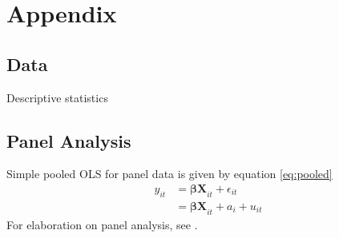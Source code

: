 \section{Appendix}
\label{s:appendix}

\subsection{Data}
\label{s:data}
\begin{table}
  \centering
  \caption{Descriptive statistics}
  \label{t:descriptive}
  
\end{table}

\subsection{Panel Analysis}
\label{s:appendix_panel}
Simple pooled OLS for panel data is given by equation \eqref{eq:pooled} \citep{wooldridge2019introductory}
\begin{align}\label{eq:pooled}
    y_{it}
    &= \bm{\beta X}_{it} + \epsilon_{it} \\ 
    &= \bm{\beta X}_{it} + a_i + u_{it} \nonumber
\end{align}
For elaboration on panel analysis, see \citet[chapter 14]{wooldridge2019introductory}.

\begin{figure}
    \centering
\end{figure}
